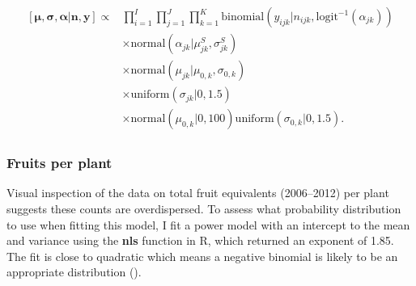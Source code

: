 \documentclass[12pt, oneside, titlepage]{article}   	%
\begin{document}

\begin{align}
  \begin{split}
 [ \bm{\mu}, \bm{\sigma}, \bm{\alpha} | \bm{n}, \bm{y} ] \propto 
 & \prod_{i=1}^{I} \prod_{j=1}^{J} \prod_{k=1}^{K} \mathrm{binomial} ( y_{ijk} | n_{ijk}, \mathrm{logit}^{-1}( \alpha_{jk} )  )
   \\ & \times \mathrm{normal} ( \alpha_{jk}  | \mu^S_{jk}, \sigma^S_{jk} )
  \\ & \times \mathrm{normal} ( \mu_{jk}  | \mu_{0,k}, \sigma_{0,k} )
  \\ & \times \mathrm{uniform} ( \sigma_{jk} | 0, 1.5)
  \\ & \times \mathrm{normal} ( \mu_{0,k} | 0 , 100 ) \mathrm{uniform} ( \sigma_{0,k} | 0, 1.5 ).
   \end{split}
\end{align}
%

\subsubsection*{Fruits per plant}

Visual inspection of the data on total fruit equivalents (2006--2012) per plant suggests these counts are overdispersed. To assess what probability distribution to use when fitting this model, I fit a power model with an intercept to the mean and variance using the \textbf{nls} function in R, which returned an exponent of 1.85. The fit is close to quadratic which means a negative binomial is likely to be an appropriate distribution (\cite{linden2011}). 
\end{document}
